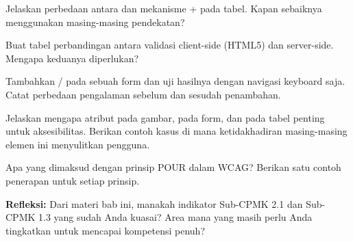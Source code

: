 \documentclass[../main.tex]{subfiles}
\begin{document}
\begin{latihan}
  \item Jelaskan perbedaan antara  dan mekanisme + pada tabel. Kapan sebaiknya menggunakan masing-masing pendekatan?
  \item Buat tabel perbandingan antara validasi client-side (HTML5) dan server-side. Mengapa keduanya diperlukan?
  \item Tambahkan / pada sebuah form dan uji hasilnya dengan navigasi keyboard saja. Catat perbedaan pengalaman sebelum dan sesudah penambahan.
  \item Jelaskan mengapa atribut  pada gambar,  pada form, dan  pada tabel penting untuk aksesibilitas. Berikan contoh kasus di mana ketidakhadiran masing-masing elemen ini menyulitkan pengguna.
  \item Apa yang dimaksud dengan prinsip POUR dalam WCAG? Berikan satu contoh penerapan untuk setiap prinsip.
  \item \textbf{Refleksi:} Dari materi bab ini, manakah indikator Sub-CPMK 2.1 dan Sub-CPMK 1.3 yang sudah Anda kuasai? Area mana yang masih perlu Anda tingkatkan untuk mencapai kompetensi penuh?
\end{latihan}
\end{document}
